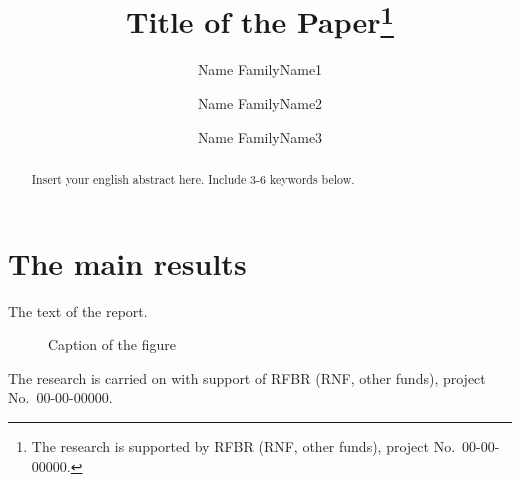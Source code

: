 \documentclass[12pt]{llncs}
\begin{document}
%
\title{Title of the Paper\thanks{The research is supported by RFBR (RNF, other funds), project No.~00-00-00000.}}
\author{Name FamilyName1
  \and
  Name FamilyName2
  \and
  Name FamilyName3
}

\maketitle

\begin{abstract}
Insert your english abstract here. Include 3-6 keywords below.

\end{abstract}

\section{The main results}


The text of the report.

\begin{figure}[htb]
  \centering

%
  \begin{center}
     \end{center}
  \caption{Caption of the figure}\label{fig:example}
\end{figure}

The research is carried on with support of RFBR (RNF, other funds), project No.~00-00-00000.
\end{document}
